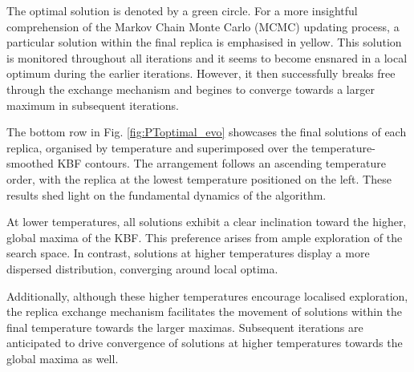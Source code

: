 \documentclass[10pt]{article}
\begin{document}
\begin{multicols}{2}
The optimal solution is denoted by a green circle. For a more insightful comprehension of the Markov Chain Monte Carlo (MCMC) updating process, a particular solution within the final replica is emphasised in yellow. This solution is monitored throughout all iterations and it seems to become ensnared in a local optimum during the earlier iterations. However, it then successfully breaks free through the exchange mechanism and begines to converge towards a larger maximum in subsequent iterations.

The bottom row in Fig. \ref{fig:PToptimal_evo} showcases the final solutions of each replica, organised by temperature and superimposed over the temperature-smoothed KBF contours. The arrangement follows an ascending temperature order, with the replica at the lowest temperature positioned on the left. These results shed light on the fundamental dynamics of the algorithm.

At lower temperatures, all solutions exhibit a clear inclination toward the higher, global maxima of the KBF. This preference arises from ample exploration of the search space. In contrast, solutions at higher temperatures display a more dispersed distribution, converging around local optima. 

Additionally, although these higher temperatures encourage localised exploration, the replica exchange mechanism facilitates the movement of solutions within the final temperature towards the larger maximas. Subsequent iterations are anticipated to drive convergence of solutions at higher temperatures towards the global maxima as well.
\end{multicols}
\end{document}

